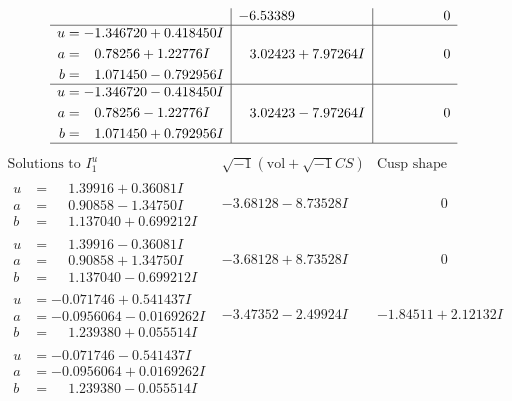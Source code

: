 \documentclass[1p]{elsarticle_modified}
\theoremstyle{definition}
\newcommand{\I}{\sqrt{-1}}
\begin{document}
$$\begin{array}{c|c|c}
 & -6.53389\phantom{ +0.000000I} & \phantom{-0.000000 } 0 \\ \hline\begin{aligned}
u &= -1.346720 + 0.418450 I \\
a &= \phantom{-}0.78256 + 1.22776 I \\
b &= \phantom{-}1.071450 - 0.792956 I\end{aligned}
 & \phantom{-}3.02423 + 7.97264 I & \phantom{-0.000000 } 0 \\ \hline\begin{aligned}
u &= -1.346720 - 0.418450 I \\
a &= \phantom{-}0.78256 - 1.22776 I \\
b &= \phantom{-}1.071450 + 0.792956 I\end{aligned}
 & \phantom{-}3.02423 - 7.97264 I & \phantom{-0.000000 } 0\\
 \hline 
 \end{array}$$\newpage$$\begin{array}{c|c|c}  
\text{Solutions to }I^u_{1}& \I (\text{vol} + \sqrt{-1}CS) & \text{Cusp shape}\\
 \hline 
\begin{aligned}
u &= \phantom{-}1.39916 + 0.36081 I \\
a &= \phantom{-}0.90858 - 1.34750 I \\
b &= \phantom{-}1.137040 + 0.699212 I\end{aligned}
 & -3.68128 - 8.73528 I & \phantom{-0.000000 } 0 \\ \hline\begin{aligned}
u &= \phantom{-}1.39916 - 0.36081 I \\
a &= \phantom{-}0.90858 + 1.34750 I \\
b &= \phantom{-}1.137040 - 0.699212 I\end{aligned}
 & -3.68128 + 8.73528 I & \phantom{-0.000000 } 0 \\ \hline\begin{aligned}
u &= -0.071746 + 0.541437 I \\
a &= -0.0956064 - 0.0169262 I \\
b &= \phantom{-}1.239380 + 0.055514 I\end{aligned}
 & -3.47352 - 2.49924 I & -1.84511 + 2.12132 I \\ \hline\begin{aligned}
u &= -0.071746 - 0.541437 I \\
a &= -0.0956064 + 0.0169262 I \\
b &= \phantom{-}1.239380 - 0.055514 I\end{aligned}

\end{array}$$
\end{document}
